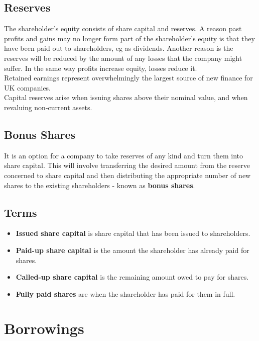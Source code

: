 \documentclass{report}
\begin{document}
\subsection{Reserves}
The shareholder's equity consists of share capital and reserves. A reason past profits and gains may no longer form part of the shareholder's equity is that they have been paid out to shareholders, eg as dividends. Another reason is the reserves will be reduced by the amount of any losses that the company might suffer. In the same way profits increase equity, losses reduce it.\\

Retained earnings represent overwhelmingly the largest source of new finance for UK companies.\\

Capital reserves arise when issuing shares above their nominal value, and when revaluing non-current assets.

\subsection{Bonus Shares}
It is an option for a company to take reserves of any kind and turn them into share capital. This will involve transferring the desired amount from the reserve concerned to share capital and then distributing the appropriate number of new shares to the existing shareholders - known as \textbf{bonus shares}.

\subsection{Terms}
\begin{itemize}
    \item \textbf{Issued share capital} is share capital that has been issued to shareholders.
    \item \textbf{Paid-up share capital} is the amount the shareholder has already paid for shares.
    \item \textbf{Called-up share capital} is the remaining amount owed to pay for shares. 
    \item \textbf{Fully paid shares} are when the shareholder has paid for them in full.
\end{itemize}

\section{Borrowings}
\end{document}
